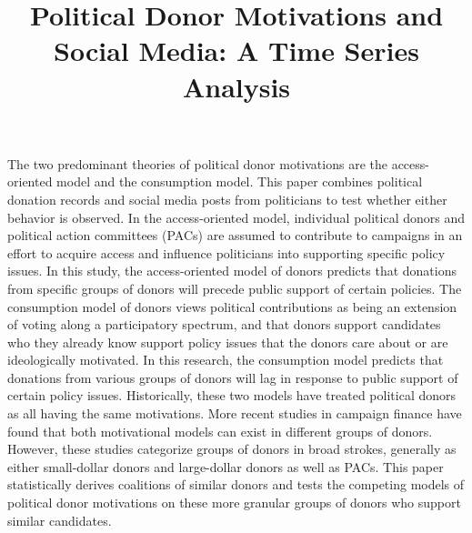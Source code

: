 \documentclass[12pt,]{article}
\title{Political Donor Motivations and Social Media: A Time Series Analysis  }
\author{\Large \vspace{0.05in} \newline\normalsize\emph{}  }
\date{}
\newcommand*{\authorfont}{\fontfamily{phv}\selectfont}
\renewenvironment{abstract}
 {{%
    \setlength{\leftmargin}{0mm}
    \setlength{\rightmargin}{\leftmargin}%
  }%
  \relax}
 {\endlist}
\begin{document}
	
%

{%
\setlength{\parindent}{0pt}
\thispagestyle{plain}
{\fontsize{18}{20}\selectfont\raggedright 
\maketitle  %

}

{
   \vskip 13.5pt\relax \normalsize\fontsize{11}{12} 
\textbf{\authorfont } \hskip 15pt \emph{\small }   

}

}








\begin{abstract}

    \hbox{\vrule height .2pt width 39.14pc}

    \vskip 8.5pt %

\noindent The two predominant theories of political donor motivations are the
access-oriented model and the consumption model. This paper combines
political donation records and social media posts from politicians to
test whether either behavior is observed. In the access-oriented model,
individual political donors and political action committees (PACs) are
assumed to contribute to campaigns in an effort to acquire access and
influence politicians into supporting specific policy issues. In this
study, the access-oriented model of donors predicts that donations from
specific groups of donors will precede public support of certain
policies. The consumption model of donors views political contributions
as being an extension of voting along a participatory spectrum, and that
donors support candidates who they already know support policy issues
that the donors care about or are ideologically motivated. In this
research, the consumption model predicts that donations from various
groups of donors will lag in response to public support of certain
policy issues. Historically, these two models have treated political
donors as all having the same motivations. More recent studies in
campaign finance have found that both motivational models can exist in
different groups of donors. However, these studies categorize groups of
donors in broad strokes, generally as either small-dollar donors and
large-dollar donors as well as PACs. This paper statistically derives
coalitions of similar donors and tests the competing models of political
donor motivations on these more granular groups of donors who support
similar candidates.


    \hbox{\vrule height .2pt width 39.14pc}


\end{abstract}
\end{document}
